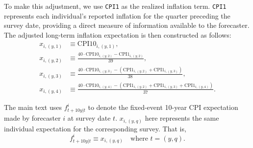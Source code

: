 \documentclass[12pt,letter,leqno]{article}
\theoremstyle{asn}
\theoremstyle{lem}
\theoremstyle{slem}
\theoremstyle{prop}
\theoremstyle{appprop}
\theoremstyle{rem}
\theoremstyle{defn}
\begin{document}
To make this adjustment, we use \texttt{CPI1} as the realized inflation term. \texttt{CPI1} represents each individual's reported inflation for the quarter preceding the survey date, providing a direct measure of information available to the forecaster. The adjusted long-term inflation expectation is then constructed as follows:
\begin{align}
x_{i,(y,1)} &\equiv \text{CPI10}_{i,(y,1)}, \\
x_{i,(y,2)} &\equiv
 \frac{40\cdot\text{CPI10}_{i,(y,2)} - \text{CPI1}_{i,(y,2)}}{39}, \\
x_{i,(y,3)} &\equiv
 \frac{40\cdot\text{CPI10}_{i,(y,3)}
 - \left(\text{CPI1}_{i,(y,2)} + \text{CPI1}_{i,(y,3)}\right)}{38}, \\
x_{i,(y,4)} &\equiv
 \frac{40\cdot\text{CPI10}_{i,(y,4)}
 - \left(\text{CPI1}_{i,(y,2)} + \text{CPI1}_{i,(y,3)}
 + \text{CPI1}_{i,(y,4)}\right)}{37}.
\end{align}

The main text uses $f_{t+10y|t}^{i}$ to denote the fixed-event 10-year CPI expectation made by forecaster $i$ at survey date $t$. $x_{i,(y, q)}$ here represents the same individual expectation for the corresponding survey. That is,
\[
f_{t+10y|t}^{i} \equiv x_{i,(y, q)} \quad \text{where } t = (y, q).
\]





%
%
\end{document}
